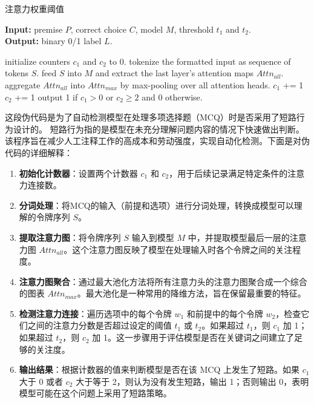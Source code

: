 \begin{algorithm}
    \small
        \caption{注意力权重阈值}
        \label{AW}
    \hspace*{0.02in} {\bf Input:} 
    premise $P$, correct choice $C$, model $M$,  threshold $t_1$ and $t_2$. \\
    \hspace*{0.02in} {\bf Output:}
    binary 0/1 label $L$.
        \begin{algorithmic}[1]
            \State initialize counters $c_1$ and $c_2$ to 0.
            \State tokenize the formatted input as sequence of tokens $S$.
            \State feed $S$ into $M$ and extract the last layer's attention maps $Attn_{all}$.
            \State aggregate $Attn_{all}$ into $Attn_{max}$ by max-pooling over all attention heads.
                    $c_1$ += 1
            \EndIf
                    $c_2$ += 1
            \EndIf
            \EndFor
            \EndFor
            \State output 1 if $c_1>0$ or $c_2\geq 2$ and 0 otherwise.
        \end{algorithmic}
    \end{algorithm}
    
    这段伪代码是为了自动检测模型在处理多项选择题（MCQ）时是否采用了短路行为设计的。
    短路行为指的是模型在未充分理解问题内容的情况下快速做出判断。
    该程序旨在减少人工注释工作的高成本和劳动强度，实现自动化检测。下面是对伪代码的详细解释：

    \begin{enumerate}
        \item \textbf{初始化计数器}：设置两个计数器 \( c_1 \) 和 \( c_2 \)，用于后续记录满足特定条件的注意力连接数。
        \item \textbf{分词处理}：将MCQ的输入（前提和选项）进行分词处理，转换成模型可以理解的令牌序列 \( S \)。
        \item \textbf{提取注意力图}：将令牌序列 \( S \) 输入到模型 \( M \) 中，并提取模型最后一层的注意力图 \( Attn_{all} \)。这个注意力图反映了模型在处理输入时各个令牌之间的关注程度。
        \item \textbf{注意力图聚合}：通过最大池化方法将所有注意力头的注意力图聚合成一个综合的图表 \( Attn_{max} \)。最大池化是一种常用的降维方法，旨在保留最重要的特征。
        \item \textbf{检测注意力连接}：遍历选项中的每个令牌 \( w_1 \) 和前提中的每个令牌 \( w_2 \)，检查它们之间的注意力分数是否超过设定的阈值 \( t_1 \) 或 \( t_2 \)。如果超过 \( t_1 \)，则 \( c_1 \) 加 1；如果超过 \( t_2 \)，则 \( c_2 \) 加 1。这一步骤用于评估模型是否在关键词之间建立了足够的关注度。
        \item \textbf{输出结果}：根据计数器的值来判断模型是否在该 MCQ 上发生了短路。如果 \( c_1 \) 大于 0 或者 \( c_2 \) 大于等于 2，则认为没有发生短路，输出 1；否则输出 0，表明模型可能在这个问题上采用了短路策略。
    \end{enumerate}
    
